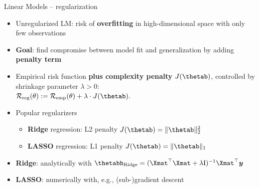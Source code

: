 
\begin{frame}{Linear Models -- regularization}


\begin{itemize}
  \item Unregularized LM: risk of \textbf{overfitting} in high-dimensional 
  space with only few observations
  \item \textbf{Goal}: find compromise between model fit and generalization by 
  adding \textbf{penalty term}
\end{itemize}

\medskip




\medskip


\begin{itemize}
  \item Empirical risk function \textbf{plus complexity penalty} 
  $J(\thetab)$, controlled by shrinkage parameter $\lambda > 0$: \\
  $\riskrt := \risket + \lambda \cdot J(\thetab).$ 
  \item Popular regularizers
  \begin{itemize} 
    \item \textbf{Ridge} regression: L2 penalty $J(\thetab) = \|\thetab\|_2^2 $
    \item \textbf{LASSO} regression: L1 penalty $J(\thetab) = \|\thetab\|_1 $
  \end{itemize}
\end{itemize}

\medskip

\begin{itemize}
  \item \textbf{Ridge}: analytically with 
  $\thetabh_{\text{Ridge}} = (\Xmat^\top \Xmat  + \lambda \id)^{-1} \Xmat^\top 
  \yv$
  \item \textbf{LASSO}: numerically with, e.g., (sub-)gradient descent
\end{itemize}

\end{frame}


